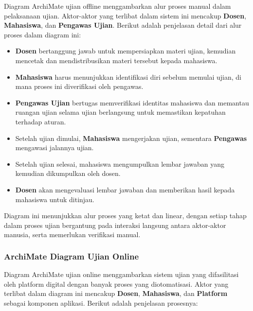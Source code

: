 Diagram ArchiMate ujian offline menggambarkan alur proses manual dalam pelaksanaan ujian. Aktor-aktor yang terlibat dalam sistem ini mencakup \textbf{Dosen}, \textbf{Mahasiswa}, dan \textbf{Pengawas Ujian}. Berikut adalah penjelasan detail dari alur proses dalam diagram ini:

\begin{itemize}
	\item \textbf{Dosen} bertanggung jawab untuk mempersiapkan materi ujian, kemudian mencetak dan mendistribusikan materi tersebut kepada mahasiswa.
	\item \textbf{Mahasiswa} harus menunjukkan identifikasi diri sebelum memulai ujian, di mana proses ini diverifikasi oleh pengawas.
	\item \textbf{Pengawas Ujian} bertugas memverifikasi identitas mahasiswa dan memantau ruangan ujian selama ujian berlangsung untuk memastikan kepatuhan terhadap aturan.
	\item Setelah ujian dimulai, \textbf{Mahasiswa} mengerjakan ujian, sementara \textbf{Pengawas} mengawasi jalannya ujian.
	\item Setelah ujian selesai, mahasiswa mengumpulkan lembar jawaban yang kemudian dikumpulkan oleh dosen.
	\item \textbf{Dosen} akan mengevaluasi lembar jawaban dan memberikan hasil kepada mahasiswa untuk ditinjau.
\end{itemize}

Diagram ini menunjukkan alur proses yang ketat dan linear, dengan setiap tahap dalam proses ujian bergantung pada interaksi langsung antara aktor-aktor manusia, serta memerlukan verifikasi manual.

\subsubsection{ArchiMate Diagram Ujian Online}

Diagram ArchiMate ujian online menggambarkan sistem ujian yang difasilitasi oleh platform digital dengan banyak proses yang diotomatisasi. Aktor yang terlibat dalam diagram ini mencakup \textbf{Dosen}, \textbf{Mahasiswa}, dan \textbf{Platform} sebagai komponen aplikasi. Berikut adalah penjelasan prosesnya:


